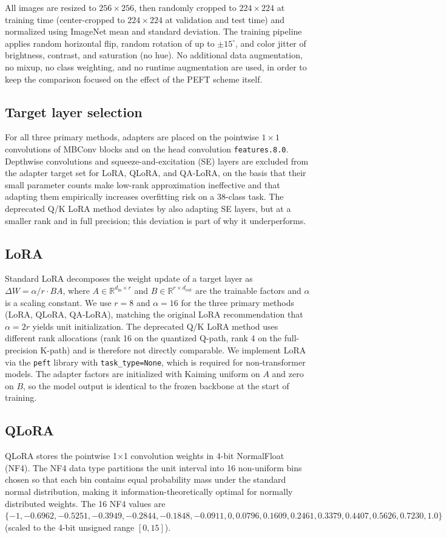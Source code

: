 \documentclass[conference]{IEEEtran}
\begin{document}
All images are resized to $256\times256$, then randomly cropped to $224\times224$ at training time (center-cropped to $224\times224$ at validation and test time) and normalized using ImageNet mean and standard deviation. The training pipeline applies random horizontal flip, random rotation of up to $\pm 15^\circ$, and color jitter of brightness, contrast, and saturation (no hue). No additional data augmentation, no mixup, no class weighting, and no runtime augmentation are used, in order to keep the comparison focused on the effect of the PEFT scheme itself.

\subsection{Target layer selection}
For all three primary methods, adapters are placed on the pointwise $1\times 1$ convolutions of MBConv blocks and on the head convolution \texttt{features.8.0}. Depthwise convolutions and squeeze-and-excitation (SE) layers are excluded from the adapter target set for LoRA, QLoRA, and QA-LoRA, on the basis that their small parameter counts make low-rank approximation ineffective and that adapting them empirically increases overfitting risk on a 38-class task. The deprecated Q/K LoRA method deviates by also adapting SE layers, but at a smaller rank and in full precision; this deviation is part of why it underperforms.

\subsection{LoRA}
Standard LoRA decomposes the weight update of a target layer as $\Delta W = \alpha/r \cdot B A$, where $A\in\mathbb{R}^{d_{\text{in}}\times r}$ and $B\in\mathbb{R}^{r\times d_{\text{out}}}$ are the trainable factors and $\alpha$ is a scaling constant. We use $r=8$ and $\alpha=16$ for the three primary methods (LoRA, QLoRA, QA-LoRA), matching the original LoRA recommendation that $\alpha = 2r$ yields unit initialization. The deprecated Q/K LoRA method uses different rank allocations (rank 16 on the quantized Q-path, rank 4 on the full-precision K-path) and is therefore not directly comparable. We implement LoRA via the \texttt{peft} library with \texttt{task\_type=None}, which is required for non-transformer models. The adapter factors are initialized with Kaiming uniform on $A$ and zero on $B$, so the model output is identical to the frozen backbone at the start of training.

\subsection{QLoRA}
QLoRA stores the pointwise 1$\times$1 convolution weights in 4-bit NormalFloat (NF4). The NF4 data type partitions the unit interval into 16 non-uniform bins chosen so that each bin contains equal probability mass under the standard normal distribution, making it information-theoretically optimal for normally distributed weights. The 16 NF4 values are $\{-1, -0.6962, -0.5251, -0.3949, -0.2844, -0.1848, -0.0911, 0, 0.0796, 0.1609, 0.2461, 0.3379, 0.4407, 0.5626, 0.7230, 1.0\}$ (scaled to the 4-bit unsigned range $[0, 15]$).
\end{document}
